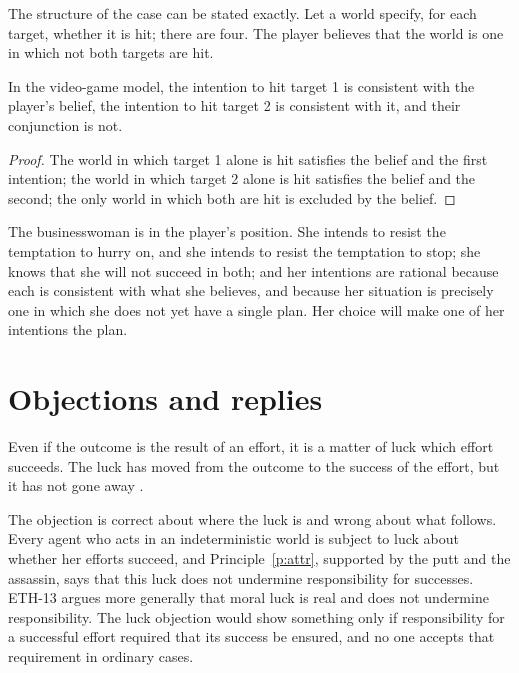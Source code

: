 \documentclass{situationist-preprint}
\begin{document}
The structure of the case can be stated exactly. Let a world specify, for each target, whether it is hit; there are four. The player believes that the world is one in which not both targets are hit.

\begin{proposition}\label{p:game}
In the video-game model, the intention to hit target 1 is consistent with the player's belief, the intention to hit target 2 is consistent with it, and their conjunction is not.
\end{proposition}

\begin{proof}
The world in which target 1 alone is hit satisfies the belief and the first intention; the world in which target 2 alone is hit satisfies the belief and the second; the only world in which both are hit is excluded by the belief.
\end{proof}

The businesswoman is in the player's position. She intends to resist the temptation to hurry on, and she intends to resist the temptation to stop; she knows that she will not succeed in both; and her intentions are rational because each is consistent with what she believes, and because her situation is precisely one in which she does not yet have a single plan. Her choice will make one of her intentions the plan.

\section{Objections and replies}

\begin{objection}
Even if the outcome is the result of an effort, it is a matter of luck which effort succeeds. The luck has moved from the outcome to the success of the effort, but it has not gone away \citep{Mele2006}.
\end{objection}

\begin{reply}
The objection is correct about where the luck is and wrong about what follows. Every agent who acts in an indeterministic world is subject to luck about whether her efforts succeed, and Principle~\ref{p:attr}, supported by the putt and the assassin, says that this luck does not undermine responsibility for successes. ETH-13 argues more generally that moral luck is real and does not undermine responsibility. The luck objection would show something only if responsibility for a successful effort required that its success be ensured, and no one accepts that requirement in ordinary cases.
\end{reply}
\end{document}
